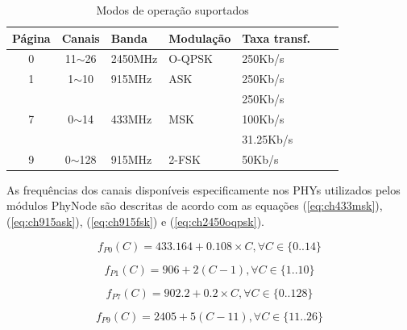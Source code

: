 \documentclass[
	12pt,				%
	openright,			%
	oneside,
	a4paper,			%
	english,			%
	french,				%
	spanish,			%
	brazil				%
	]{abntex2}
\begin{document}
	\begin{table}[h]
		\centering
		\begin{tabular}{|c|c|l|l|l|l|l|}
			\hline
			\textbf{Página}    & \multicolumn{1}{l|}{\textbf{Canais}}   & \textbf{Banda}          & \textbf{Modulação}   & \textbf{Taxa transf.} \\ \hline
			0                  & 11$\sim$26                             & 2450MHz                 & O-QPSK               & 250Kb/s               \\ \hline
			1                  & 1$\sim$10                              & 915MHz                  & ASK                  & 250Kb/s               \\ \hline
			\multirow{3}{*}{7} & \multirow{3}{*}{0$\sim$14}             & \multirow{3}{*}{433MHz} & \multirow{3}{*}{MSK} & 250Kb/s               \\
			&                                        &                         &                      & 100Kb/s               \\
			&                                        &                         &                      & 31.25Kb/s             \\ \hline
			9                  & 0$\sim$128                             & 915MHz                  & 2-FSK                & 50Kb/s                \\ \hline 
		\end{tabular}
		\caption{Modos de operação suportados}
		\label{tab:modos_opr}
	\end{table}
	
	As frequências dos canais disponíveis especificamente nos PHYs utilizados pelos módulos PhyNode são  descritas de acordo com as equações (\ref{eq:ch433msk}), (\ref{eq:ch915ask}), (\ref{eq:ch915fsk}) e (\ref{eq:ch2450oqpsk}).
	
	\begin{equation}
	\label{eq:ch433msk}
	f_{P0}(C) = 433.164 + 0.108\times C, \forall C \in \{0..14\}
	\end{equation}
	
	\begin{equation}
	\label{eq:ch915ask}
	f_{P1}(C) = 906 + 2 (C - 1), \forall C \in \{1..10\}
	\end{equation}
	
	\begin{equation}
	\label{eq:ch915fsk}
	f_{P7}(C) = 902.2 + 0.2 \times C, \forall C \in \{0..128\}
	\end{equation}
	
	\begin{equation}
	\label{eq:ch2450oqpsk}
	f_{P9}(C) = 2405 + 5 (C - 11), \forall C \in \{11..26\}
	\end{equation}
	
\end{document}
